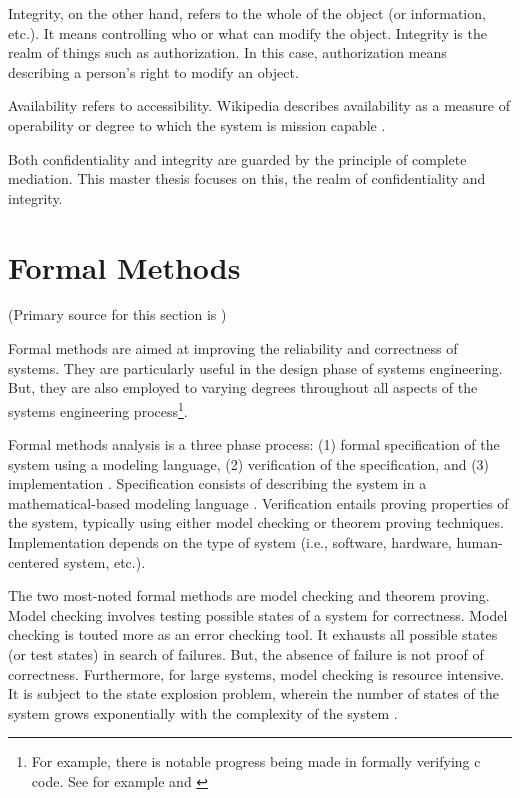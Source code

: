 \documentclass[../../main/main.tex]{subfiles}
\begin{document}
Integrity, on the other hand, refers to the whole of the object (or information, etc.).  It means controlling who or what can modify the object.   Integrity is the realm of things such as authorization.  In this case, authorization means describing a person's right to modify an object.  

Availability refers to accessibility.  Wikipedia describes availability as a measure of operability or degree to which the system is mission capable \cite {availability}. 

Both confidentiality and integrity are guarded by the principle of complete mediation.  This master thesis focuses on this, the realm of confidentiality and integrity.

\section{Formal Methods}
(Primary source for this section is \cite{formalCarnegie})

Formal methods are aimed at improving the reliability and correctness of systems\cite{formalmethodslcarke}.  They are particularly useful in the design phase of systems engineering.  But, they are also employed to varying degrees throughout all aspects of the systems engineering process\footnote{For example, there is notable progress being made in formally verifying c code.  See for example \cite{jvmcmv} and \cite{VARVEL}}.  

Formal methods analysis is a three phase process: (1) formal specification of the system using a modeling language, (2) verification of the specification, and (3) implementation \cite{formalCarnegie}.  Specification consists of describing the system in a mathematical-based modeling language \cite{formalCarnegie}.  Verification entails proving properties of the system, typically using either model checking or theorem proving techniques.  Implementation depends on the type of system (i.e., software, hardware, human-centered system, etc.).

The two most-noted formal methods are model checking and theorem proving.  Model checking involves testing possible states of a system for correctness.  Model checking is touted more as an error checking tool.  It exhausts all possible states (or test states) in search of failures.  But, the absence of failure is not proof of correctness.  Furthermore, for large systems, model checking is resource intensive.  It is subject to the state explosion problem, wherein the number of states of the system grows exponentially with the complexity of the system \cite{stateexplosion}. 
\end{document}
